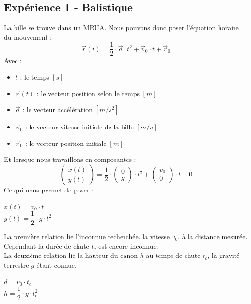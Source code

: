 \documentclass[11pt]{article}
\begin{document}
\subsection{Expérience 1 - Balistique} \label{subsec:intro1}
La bille se trouve dans un MRUA. Nous pouvons donc poser l'équation horaire du mouvement :
$$ \vec{r}(t)=\dfrac{1}{2} \cdot \vec{a} \cdot t^2+\vec{v}_0 \cdot t + \vec{r}_0$$
 Avec :
\begin{itemize}
 \item $t$ : le temps $[s]$
 \item $\vec{r}(t)$ : le vecteur position selon le temps $[m]$
 \item $\vec{a}$ : le vecteur accélération $[m/s^2]$ 
 \item $\vec{v}_0$ : le vecteur vitesse initiale de la bille $[m/s]$  
 \item $\vec{r}_0$ : le vecteur position initiale $[m]$
\end{itemize}
Et lorsque nous travaillons en composantes : $$\begin{pmatrix} x(t)\\y(t) \end{pmatrix}=\dfrac{1}{2} \cdot \begin{pmatrix} 0\\g \end{pmatrix} \cdot t^2 +\begin{pmatrix} v_0\\0 \end{pmatrix} \cdot t+0$$
Ce qui nous permet de poser : \begin{center} 
$x(t)=v_0 \cdot t$ \\
$y(t)= \dfrac{1}{2} \cdot g \cdot t^2$
\end{center}
La première relation lie l'inconnue recherchée, la vitesse $v_0$, à la distance mesurée. Cependant la durée de chute $t_c$ est encore inconnue. \\La deuxième relation lie
la hauteur du canon $h$ au temps de chute $t_c$, la gravité terrestre $g$ étant connue. \begin{center}
$d=v_0 \cdot t_c$\\
$h= \dfrac{1}{2} \cdot g \cdot t^2_c$
\end{center}
\end{document}
